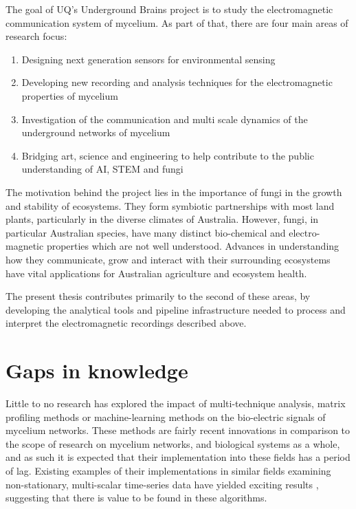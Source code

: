 The goal of UQ's Underground Brains project is to study the electromagnetic communication system of mycelium. As part of that, there are four main areas of research focus:

\begin{enumerate}
  \item Designing next generation sensors for environmental sensing
  \item Developing new recording and analysis techniques for the electromagnetic properties of mycelium
  \item Investigation of the communication and multi scale dynamics of the underground networks of mycelium
  \item Bridging art, science and engineering to help contribute to the public understanding of AI, STEM and fungi
\end{enumerate}

The motivation behind the project lies in the importance of fungi in the growth and stability of ecosystems. They form symbiotic partnerships with most land plants, particularly in the diverse climates of Australia. However, fungi, in particular Australian species, have many distinct bio-chemical and electro-magnetic properties which are not well understood. Advances in understanding how they communicate, grow and interact with their surrounding ecosystems have vital applications for Australian agriculture and ecosystem health.

The present thesis contributes primarily to the second of these areas, by developing the analytical tools and pipeline infrastructure needed to process and interpret the electromagnetic recordings described above.

\section{Gaps in knowledge}
\label{sec:gaps}

Little to no research has explored the impact of multi-technique analysis, matrix profiling methods or machine-learning methods on the bio-electric signals of mycelium networks. These methods are fairly recent innovations in comparison to the scope of research on mycelium networks, and biological systems as a whole, and as such it is expected that their implementation into these fields has a period of lag. Existing examples of their implementations in similar fields examining non-stationary, multi-scalar time-series data have yielded exciting results \cite{shi} \cite{ponganis} \cite{liu}, suggesting that there is value to be found in these algorithms.


